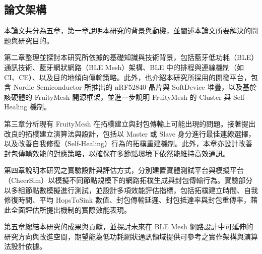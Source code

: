 \begin{ZhChapter}
\section{論文架構}
本論文共分為五章，第一章說明本研究的背景與動機，並闡述本論文所要解決的問題與研究目的。

第二章整理並探討本研究所依據的基礎知識與技術背景，包括藍牙低功耗（BLE）通訊技術、藍牙網狀網路（BLE Mesh）架構、BLE 中的排程與連線機制（如 CI、CE）、以及目的地傾向傳輸策略。此外，也介紹本研究所採用的開發平台，包含 Nordic Semiconductor 所推出的 nRF52840 晶片與 SoftDevice 堆疊，以及基於該硬體的 FruityMesh 開源框架，並進一步說明 FruityMesh 的 Cluster 與 Self-Healing 機制。

第三章分析現有 FruityMesh 在拓樸建立與封包傳輸上可能出現的問題。接著提出改良的拓樸建立演算法與設計，包括以 Master 或 Slave 身分進行最佳連線選擇，以及改善自我修復（Self-Healing）行為的拓樸重建機制。此外，本章亦設計改善封包傳輸效能的對應策略，以確保在多節點環境下依然能維持高效通訊。

第四章說明本研究之實驗設計與評估方式，分別建置實體測試平台與模擬平台（CheerSim）以模擬不同節點規模下的網路拓樸生成與封包傳輸行為。實驗部分以多組節點數模擬進行測試，並設計多項效能評估指標，包括拓樸建立時間、自我修復時間、平均 HopsToSink 數值、封包傳輸延遲、封包抵達率與封包重傳率，藉此全面評估所提出機制的實際效能表現。

第五章總結本研究的成果與貢獻，並探討未來在 BLE Mesh 網路設計中可延伸的研究方向與改進空間，期望能為低功耗網狀通訊領域提供可參考之實作架構與演算法設計依據。


\end{ZhChapter}